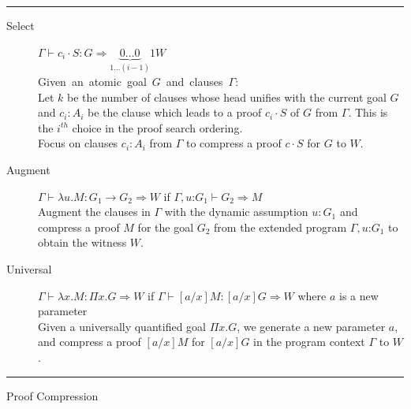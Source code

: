 \documentclass{acmconf}
\newcommand{\figfoot}{\vspace{1ex}\hrule}
\newcommand{\fighead}{\hrule\vspace{1.5ex}}
\newcommand{\vd}{\vdash}
\newcommand{\arrow}{\rightarrow}
\newcommand{\oftp}{\mathord{:}}
\begin{document}
\begin{table}[h]
\fighead
\begin{center}
\begin{small}
\begin{description}
\item[Select] $\Gamma \vd c_i \cdot S: G \Rightarrow
  \underset{1 \ldots (i-1)}{\underbrace{0\ldots 0}}1
W $ \\
    \mbox{Given an atomic goal $G$ and clauses $\Gamma$:}\hfill\\
    Let $k$ be the number of clauses whose head unifies with the
    current goal $G$ and $c_i : A_i$ be the clause which leads to a
    proof $c_i\cdot S$ of $G$ from $\Gamma$. This is the $i^{th}$ 
    choice in the proof search ordering.\\
    Focus on clauses $c_i : A_i$ from $\Gamma$ to compress a proof
     $c\cdot S$ for $G$ to $W$.

\item[Augment] $\Gamma \vd   \lambda u. M : G_1 \arrow G_2 \Rightarrow
  W$ if $\Gamma,
  u\oftp G_1 \vd G_2 \Rightarrow M$ \\
Augment the clauses in $\Gamma$ with the dynamic assumption $u : G_1$ and
compress a proof $M$ for the goal $G_2$ from the extended program
$\Gamma, u \oftp G_1$ to obtain the witness $W$. 
\item[Universal] $\Gamma \vd  \lambda x. M : \Pi x. G \Rightarrow W$ if $\Gamma \vd
  [a/x]M: [a/x]G\Rightarrow W$ where $a$ is a new parameter\\
Given a universally quantified goal $\Pi x. G$, we generate a new
parameter $a$, and compress a proof $[a/x]M$  for $[a/x]G$ in the
program context $\Gamma$ to $W$.
\end{description}
\end{small}    
\end{center}
\figfoot
\caption{\label{fig:pwgen}Proof Compression}
\end{table}


\end{document}
